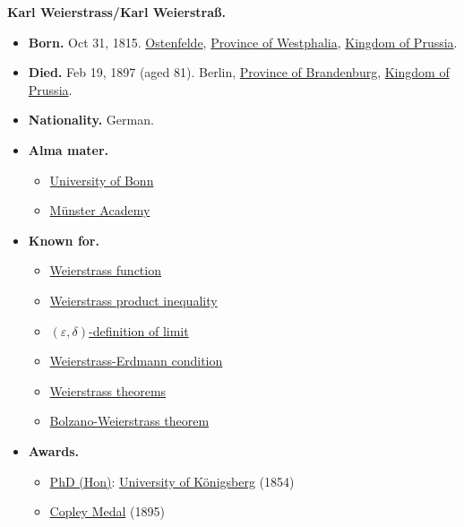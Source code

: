 \documentclass{book}
\numberwithin{equation}{section}
\begin{document}
\textbf{Karl Weierstrass/Karl Weierstraß.}
\begin{itemize}
    \item \textbf{Born.} Oct 31, 1815. \href{https://en.wikipedia.org/wiki/Ennigerloh}{Ostenfelde}, \href{https://en.wikipedia.org/wiki/Province_of_Westphalia}{Province of Westphalia}, \href{https://en.wikipedia.org/wiki/Kingdom_of_Prussia}{Kingdom of Prussia}.
    \item \textbf{Died.} Feb 19, 1897 (aged 81). Berlin, \href{https://en.wikipedia.org/wiki/Province_of_Brandenburg}{Province of Brandenburg}, \href{https://en.wikipedia.org/wiki/Kingdom_of_Prussia}{Kingdom of Prussia}.
    \item \textbf{Nationality.} German.
    \item \textbf{Alma mater.}
    \begin{itemize}
        \item \href{https://en.wikipedia.org/wiki/University_of_Bonn}{University of Bonn}
        \item \href{https://en.wikipedia.org/wiki/University_of_M%C3%BCnster}{Münster Academy}
    \end{itemize}
    \item \textbf{Known for.}
    \begin{itemize}
        \item \href{https://en.wikipedia.org/wiki/Weierstrass_function}{Weierstrass function}
        \item \href{https://en.wikipedia.org/wiki/Weierstrass_product_inequality}{Weierstrass product inequality}
        \item \href{https://en.wikipedia.org/wiki/(%CE%B5,_%CE%B4)-definition_of_limit}{$(\varepsilon,\delta)$-definition of limit}
        \item \href{https://en.wikipedia.org/wiki/Weierstrass%E2%80%93Erdmann_condition}{Weierstrass-Erdmann condition}
        \item \href{https://en.wikipedia.org/wiki/Weierstrass_theorem_(disambiguation)}{Weierstrass theorems}
        \item \href{https://en.wikipedia.org/wiki/Bolzano-Weierstrass_theorem}{Bolzano-Weierstrass theorem}
    \end{itemize}
    \item \textbf{Awards.}
    \begin{itemize}
        \item \href{https://en.wikipedia.org/wiki/PhD_(Hon)}{PhD (Hon)}: \href{https://en.wikipedia.org/wiki/University_of_K%C3%B6nigsberg}{University of Königsberg} (1854)
        \item \href{https://en.wikipedia.org/wiki/Copley_Medal}{Copley Medal} (1895)
    \end{itemize}
\end{itemize}
\end{document}
